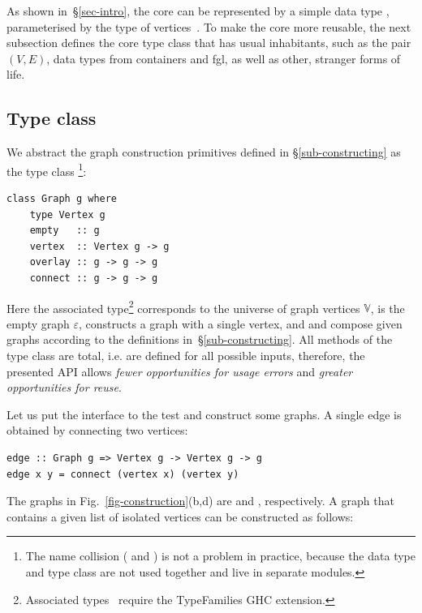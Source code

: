 As shown in~\S\ref{sec-intro}, the core can be represented by a simple
data type , parameterised by the type of vertices~.
To make the core more reusable, the next subsection defines the core type class that
has usual inhabitants, such as the pair $(V,E)$, data types from
\textsf{containers} and \textsf{fgl}, as well as other, stranger forms of life.

\subsection{Type class}\label{sub-class}

We abstract the graph construction primitives defined in \S\ref{sub-constructing}
as the type class \footnote{The name collision (
and ) is not a problem in practice, because the data type and type class
are not used together and live in separate modules.}:

\begin{verbatim}
class Graph g where
    type Vertex g
    empty   :: g
    vertex  :: Vertex g -> g
    overlay :: g -> g -> g
    connect :: g -> g -> g
\end{verbatim}

\noindent
Here the associated type\footnote{Associated
types~\cite{2005_associated_type_chakravarty} require the \textsf{TypeFamilies}
GHC extension.}  corresponds to the universe of graph
vertices $\mathbb{V}$,  is the empty graph
$\varepsilon$,  constructs a graph with a single vertex,
and  and  compose given graphs according to
the definitions in~\S\ref{sub-constructing}. All methods of the type class
are total, i.e. are defined for all possible inputs, therefore,
the presented API allows \emph{fewer opportunities for usage errors}
and \emph{greater opportunities for reuse}.

Let us put the interface to the test and construct some graphs. A single edge is
obtained by connecting two vertices:

\begin{verbatim}
edge :: Graph g => Vertex g -> Vertex g -> g
edge x y = connect (vertex x) (vertex y)
\end{verbatim}

\noindent
The graphs in Fig.~\ref{fig-construction}(b,d) are  and
, respectively.
A graph that contains a given list of isolated vertices can be constructed
as follows:

